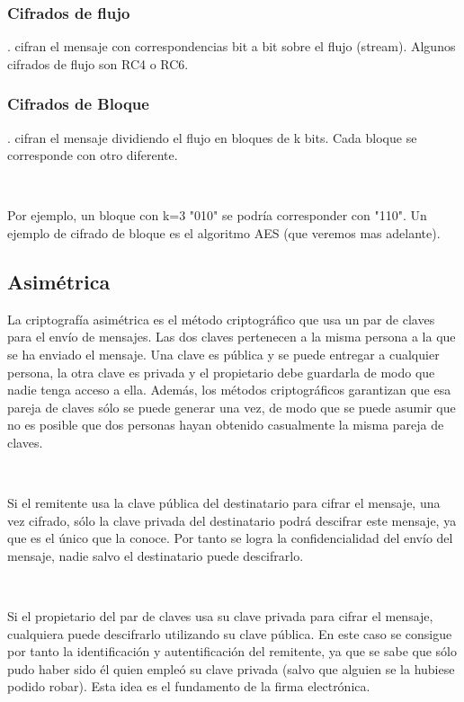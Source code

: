 \documentclass[11pt, conference]{IEEEtran}
\begin{document}
\subsubsection{Cifrados de flujo}. cifran el mensaje con correspondencias bit a bit sobre el flujo (stream). Algunos cifrados de flujo son RC4 o RC6.

\subsubsection{Cifrados de Bloque}. cifran el mensaje dividiendo el flujo en bloques de k bits. Cada bloque se corresponde con otro diferente. 

\

Por ejemplo, un bloque con k=3 "010" se podría corresponder con "110". Un ejemplo de cifrado de bloque es el algoritmo AES (que veremos mas adelante).

\subsection{Asimétrica}
La criptografía asimétrica es el método criptográfico que usa un par de claves para el envío de mensajes. Las dos claves pertenecen a la misma persona a la que se ha enviado el mensaje. Una clave es pública y se puede entregar a cualquier persona, la otra clave es privada y el propietario debe guardarla de modo que nadie tenga acceso a ella. Además, los métodos criptográficos garantizan que esa pareja de claves sólo se puede generar una vez, de modo que se puede asumir que no es posible que dos personas hayan obtenido casualmente la misma pareja de claves.

\

Si el remitente usa la clave pública del destinatario para cifrar el mensaje, una vez cifrado, sólo la clave privada del destinatario podrá descifrar este mensaje, ya que es el único que la conoce. Por tanto se logra la confidencialidad del envío del mensaje, nadie salvo el destinatario puede descifrarlo.\cite{f}

\

Si el propietario del par de claves usa su clave privada para cifrar el mensaje, cualquiera puede descifrarlo utilizando su clave pública. En este caso se consigue por tanto la identificación y autentificación del remitente, ya que se sabe que sólo pudo haber sido él quien empleó su clave privada (salvo que alguien se la hubiese podido robar). Esta idea es el fundamento de la firma electrónica.
\end{document}
